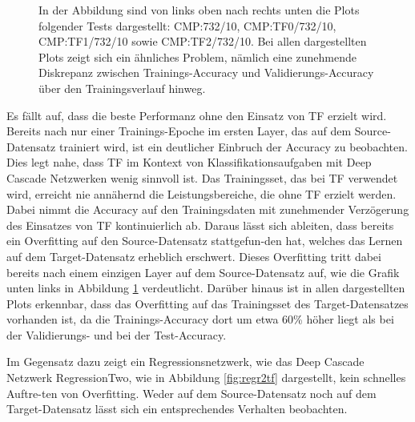 \begin{figure}[htpb]
    \caption{\label{fig:layertf} 
    \small{In der Abbildung sind von links oben nach rechts unten die Plots folgender Tests dargestellt: CMP:732/10, CMP:TF0/732/10, 
    CMP:TF1/732/10 sowie CMP:TF2/732/10. Bei allen dargestellten Plots zeigt sich ein ähnliches Problem, nämlich eine zunehmende Diskrepanz 
    zwischen Trainings-Accuracy und Validierungs-Accuracy über den Trainingsverlauf hinweg.}}
\end{figure}

Es fällt auf, dass die beste Performanz ohne den Einsatz von TF erzielt wird. Bereits nach nur einer Trainings-Epoche im 
ersten Layer, das auf dem Source-Datensatz trainiert wird, ist ein deutlicher Einbruch der Accuracy zu beobachten. Dies legt nahe, dass TF im 
Kontext von Klassifikationsaufgaben mit Deep Cascade Netzwerken wenig sinnvoll ist. Das Trainingsset, das bei TF verwendet wird, erreicht nie 
annähernd die Leistungsbereiche, die ohne TF erzielt werden. 
Dabei nimmt die Accuracy auf den Trainingsdaten mit zunehmender Verzögerung des Einsatzes von TF kontinuierlich ab. 
Daraus lässt sich ableiten, dass bereits ein Overfitting auf den Source-Datensatz 
stattgefun-den hat, welches das Lernen auf dem Target-Datensatz erheblich erschwert. Dieses Overfitting tritt dabei bereits nach einem einzigen 
Layer auf dem Source-Datensatz auf, wie die Grafik unten links in Abbildung \ref{fig:layertf} verdeutlicht. Darüber hinaus ist in allen 
dargestellten Plots erkennbar, dass das Overfitting auf das Trainingsset des Target-Datensatzes vorhanden ist, da die Trainings-Accuracy dort 
um etwa 60\% höher liegt als bei der Validierungs- und bei der Test-Accuracy.

Im Gegensatz dazu zeigt ein Regressionsnetzwerk, wie das Deep Cascade Netzwerk RegressionTwo, wie in Abbildung \ref{fig:regr2tf} dargestellt, 
kein schnelles Auftre-ten von Overfitting. Weder auf dem Source-Datensatz noch auf dem Target-Datensatz lässt sich ein entsprechendes Verhalten 
beobachten.

